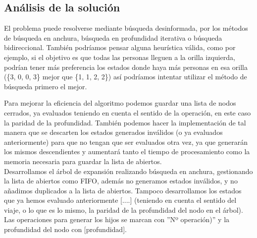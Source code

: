 \documentclass{article}
\begin{document}
\subsection{Análisis de la solución}
El problema puede resolverse mediante búsqueda desinformada, por los métodos de búsqueda en anchura, búsqueda en profundidad iterativa o búsqueda bidireccional. También podríamos pensar alguna heurística válida, como por ejemplo, si el objetivo es que todas las personas lleguen a la orilla izquierda, podrían tener más preferencia los estados donde haya más personas en esa orilla (\{3, 0, 0, 3\} mejor que \{1, 1, 2, 2\}) así podríamos intentar utilizar el método de búsqueda primero el mejor.

Para mejorar la eficiencia del algoritmo podemos guardar una lista de nodos cerrados, ya evaluados teniendo en cuenta el sentido de la operación, en este caso la paridad de la profundidad. También podemos hacer la implementación de tal manera que se descarten los estados generados inválidos (o ya evaluados anteriormente) para que no tengan que ser evaluados otra vez, ya que generarán los mismos descendientes y aumentará tanto el tiempo de procesamiento como la memoria necesaria para guardar la lista de abiertos.\\

Desarrollamos el árbol de expansión realizando búsqueda en anchura, gestionando la lista de abiertos como FIFO, además no generamos estados inválidos, y no añadimos duplicados a la lista de abiertos. Tampoco desarrollamos los estados que ya hemos evaluado anteriormente [....] (teniendo en cuenta el sentido del viaje, o lo que es lo mismo, la paridad de la profundidad del nodo en el árbol). Las operaciones para generar los hijos se marcan con ''Nº operación)'' y la profundidad del nodo con [profundidad]. \\
\end{document}
